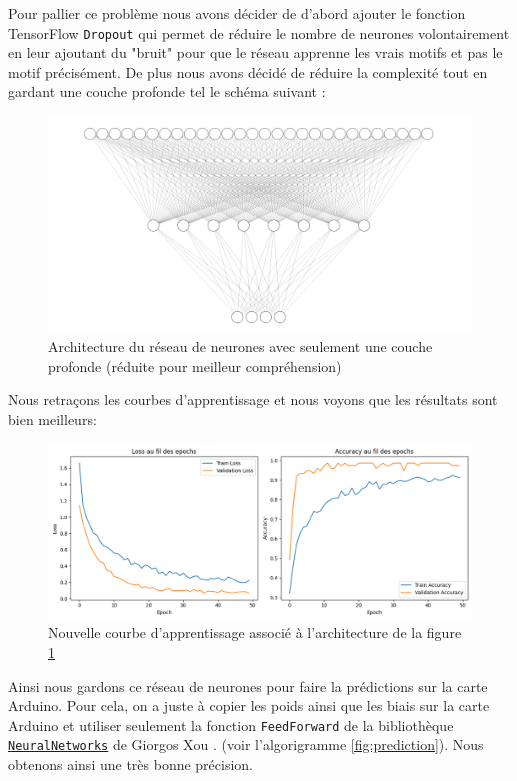 \documentclass[a4paper,11pt]{article}
\begin{document}
Pour pallier ce problème nous avons décider de d'abord ajouter le fonction TensorFlow \texttt{Dropout} \cite{tensorflow} qui permet de réduire le nombre de neurones volontairement en leur ajoutant du "bruit" pour que le réseau apprenne les vrais motifs et pas le motif précisément. De plus nous avons décidé de réduire la complexité tout en gardant une couche profonde tel le schéma suivant : 
\begin{figure}[H]
\centering
\includegraphics[scale=0.6]{images/cnn9.png}
\caption{Architecture du réseau de neurones avec seulement une couche profonde (réduite pour meilleur compréhension)}\label{fig:complex2}
\end{figure}
Nous retraçons les courbes d'apprentissage et nous voyons que les résultats sont bien meilleurs:
\begin{figure}[H]
\centering
\includegraphics[scale=0.5]{images/loss_2.png}
\caption{Nouvelle courbe d'apprentissage associé à l'architecture de la figure \ref{fig:complex2}}
\end{figure}
Ainsi nous gardons ce réseau de neurones pour faire la prédictions sur la carte Arduino. Pour cela, on a juste à copier les poids ainsi que les biais sur la carte Arduino et utiliser seulement la fonction \texttt{FeedForward} de la bibliothèque \href{https://github.com/GiorgosXou/NeuralNetworks}{\texttt{NeuralNetworks}} de Giorgos Xou \cite{neural}. (voir l'algorigramme \ref{fig:prediction}). Nous obtenons ainsi une très bonne précision.
\end{document}
